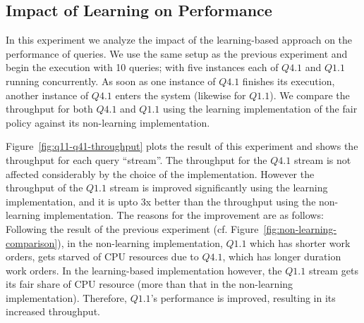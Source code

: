 \subsection{Impact of Learning on Performance}\label{ssec:learning-impact-perf}
In this experiment we analyze the impact of the learning-based approach on the performance of queries. 
We use the same setup as the previous experiment and begin the execution with 10 queries; with five instances each of $Q4.1$ and $Q1.1$ running concurrently. 
As soon as one instance of $Q4.1$ finishes its execution, another instance of $Q4.1$ enters the system (likewise for $Q1.1$).
We compare the throughput for both $Q4.1$ and $Q1.1$ using the learning implementation of the fair policy against its non-learning implementation.



Figure~\ref{fig:q11-q41-throughput} plots the result of this experiment and shows the throughput for each query ``stream''. 
The throughput for the $Q4.1$ stream is not affected considerably by the choice of the implementation. 
However the throughput of the $Q1.1$ stream is improved significantly using the learning implementation, and it is upto 3x better than the throughput using the non-learning implementation. 
The reasons for the improvement are as follows:
Following the result of the previous experiment (cf. Figure~\ref{fig:non-learning-comparison}), in the non-learning implementation, $Q1.1$ which has shorter work orders, gets starved of CPU resources due to $Q4.1$, which has longer duration work orders. 
In the learning-based implementation however, the $Q1.1$ stream gets its fair share of CPU resource (more than that in the non-learning implementation). 
Therefore, $Q1.1$'s performance is improved, resulting in its increased throughput. 

